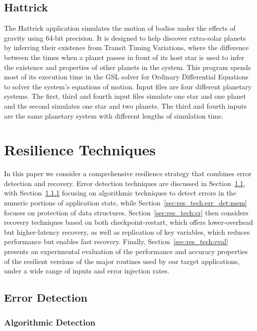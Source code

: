 \documentclass{sig-alternate}
\begin{document}
\subsection{Hattrick}
\label{sec:apps:hattrick}
The Hattrick application simulates the motion of bodies under the effects of gravity using 64-bit precision.
It is designed to help discover extra-solar planets by inferring their existence from Transit Timing Variations, where the difference between the times when a planet passes in front of its host star is used to infer the existence and properties of other planets in the system.
This program spends most of its execution time in the GSL solver for Ordinary Differential Equations to solver the system's equations of motion.
Input files are four different planetary systems. The first, third and fourth input files simulate one star and one planet and the second simulates one star and two planets. The third and fourth inputs are the same planetary system with different lengths of simulation time.

\section{Resilience Techniques}
\label{sec:res_tech}

In this paper we consider a comprehensive resilience strategy that combines error detection and recovery.
Error detection techniques are discussed in Section~\ref{sec:res_tech:err_det}, with Section~\ref{sec:res_tech:err_det:algo} focusing on algorithmic techniques to detect errors in the numeric portions of application state, while Section~\ref{sec:res_tech:err_det:mem} focuses on protection of data structures.
Section~\ref{sec:res_tech:cr} then considers recovery techniques based on both checkpoint-restart, which offers lower-overhead but higher-latency recovery, as well as replication of key variables, which reduces performance but enables fast recovery.
Finally, Section~\ref{sec:res_tech:eval} presents an experimental evaluation of the performance and accuracy properties of the resilient versions of the major routines used by our target applications, under a wide range of inputs and error injection rates.

\subsection{Error Detection}
\label{sec:res_tech:err_det}

\subsubsection{Algorithmic Detection}
\label{sec:res_tech:err_det:algo}
\end{document}
